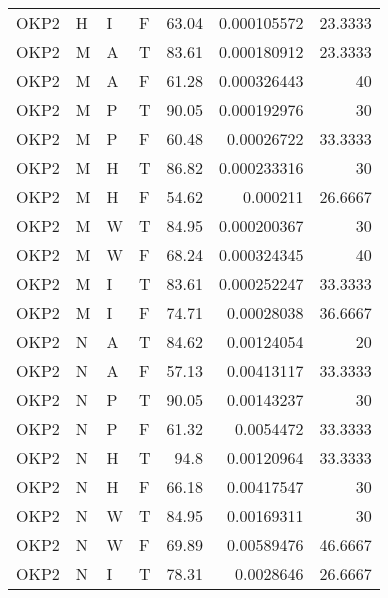 \begin{longtable}{llllrrr}
    OKP2     & H         & I         & F          & 63.04      & 0.000105572 & 23.3333  \\
    OKP2     & M         & A         & T          & 83.61      & 0.000180912 & 23.3333  \\
    OKP2     & M         & A         & F          & 61.28      & 0.000326443 & 40       \\
    OKP2     & M         & P         & T          & 90.05      & 0.000192976 & 30       \\
    OKP2     & M         & P         & F          & 60.48      & 0.00026722  & 33.3333  \\
    OKP2     & M         & H         & T          & 86.82      & 0.000233316 & 30       \\
    OKP2     & M         & H         & F          & 54.62      & 0.000211    & 26.6667  \\
    OKP2     & M         & W         & T          & 84.95      & 0.000200367 & 30       \\
    OKP2     & M         & W         & F          & 68.24      & 0.000324345 & 40       \\
    OKP2     & M         & I         & T          & 83.61      & 0.000252247 & 33.3333  \\
    OKP2     & M         & I         & F          & 74.71      & 0.00028038  & 36.6667  \\
    OKP2     & N         & A         & T          & 84.62      & 0.00124054  & 20       \\
    OKP2     & N         & A         & F          & 57.13      & 0.00413117  & 33.3333  \\
    OKP2     & N         & P         & T          & 90.05      & 0.00143237  & 30       \\
    OKP2     & N         & P         & F          & 61.32      & 0.0054472   & 33.3333  \\
    OKP2     & N         & H         & T          & 94.8       & 0.00120964  & 33.3333  \\
    OKP2     & N         & H         & F          & 66.18      & 0.00417547  & 30       \\
    OKP2     & N         & W         & T          & 84.95      & 0.00169311  & 30       \\
    OKP2     & N         & W         & F          & 69.89      & 0.00589476  & 46.6667  \\
    OKP2     & N         & I         & T          & 78.31      & 0.0028646   & 26.6667  \\

\end{longtable}

